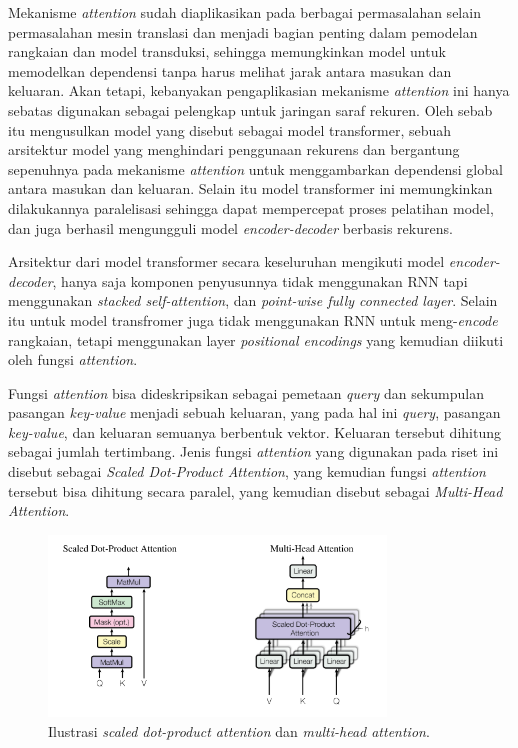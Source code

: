 Mekanisme \textit{attention} sudah diaplikasikan pada berbagai permasalahan selain permasalahan mesin translasi dan menjadi bagian penting dalam pemodelan rangkaian dan model transduksi, sehingga memungkinkan model untuk memodelkan dependensi tanpa harus melihat jarak antara masukan dan keluaran. Akan tetapi, kebanyakan pengaplikasian mekanisme \textit{attention} ini hanya sebatas digunakan sebagai pelengkap untuk jaringan saraf rekuren. Oleh sebab itu \textcite{Vaswani2017} mengusulkan model yang disebut sebagai model transformer, sebuah arsitektur model yang menghindari penggunaan rekurens dan bergantung sepenuhnya pada mekanisme \textit{attention} untuk menggambarkan dependensi global antara masukan dan keluaran. Selain itu model transformer ini memungkinkan dilakukannya paralelisasi sehingga dapat mempercepat proses pelatihan model, dan juga berhasil mengungguli model \textit{encoder-decoder} berbasis rekurens.
\bigskip

Arsitektur dari model transformer secara keseluruhan mengikuti model \textit{encoder-decoder}, hanya saja komponen penyusunnya tidak menggunakan RNN tapi menggunakan \textit{stacked self-attention}, dan \textit{point-wise fully connected layer}. Selain itu untuk model transfromer juga tidak menggunakan RNN untuk meng-\textit{encode} rangkaian, tetapi menggunakan layer \textit{positional encodings} yang kemudian diikuti oleh fungsi \textit{attention}.
\bigskip

Fungsi \textit{attention} bisa dideskripsikan sebagai pemetaan \textit{query} dan sekumpulan pasangan \textit{key-value} menjadi sebuah keluaran, yang pada hal ini \textit{query}, pasangan \textit{key-value}, dan keluaran semuanya berbentuk vektor. Keluaran tersebut dihitung sebagai jumlah tertimbang. Jenis fungsi \textit{attention} yang digunakan pada riset ini disebut sebagai \textit{Scaled Dot-Product Attention}, yang kemudian fungsi \textit{attention} tersebut bisa dihitung secara paralel, yang kemudian disebut sebagai \textit{Multi-Head Attention}.

\begin{figure}[h]
    \centering
    \includegraphics[width=0.8\textwidth]{resources/images/2-jenis-attention.png}
    \caption{Ilustrasi \textit{scaled dot-product attention} dan \textit{multi-head attention}. \parencite{Vaswani2017}}
    \label{fig:jenis-attention}
\end{figure}

